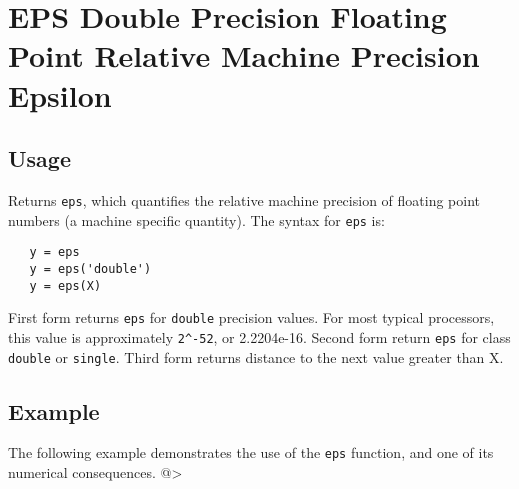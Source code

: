 \section{EPS Double Precision Floating Point Relative Machine Precision Epsilon}

\subsection{Usage}

Returns \verb|eps|, which quantifies the relative machine precision
of floating point numbers (a machine specific quantity).  The syntax
for \verb|eps| is:
\begin{verbatim}
   y = eps
   y = eps('double')
   y = eps(X)
\end{verbatim}
First form returns \verb|eps| for \verb|double| precision values. For most
typical processors, this value is approximately \verb|2^-52|, or 2.2204e-16.
Second form return \verb|eps| for class \verb|double| or \verb|single|.
Third form returns distance to the next value greater than X.
\subsection{Example}

The following example demonstrates the use of the \verb|eps| function,
and one of its numerical consequences.
@>
